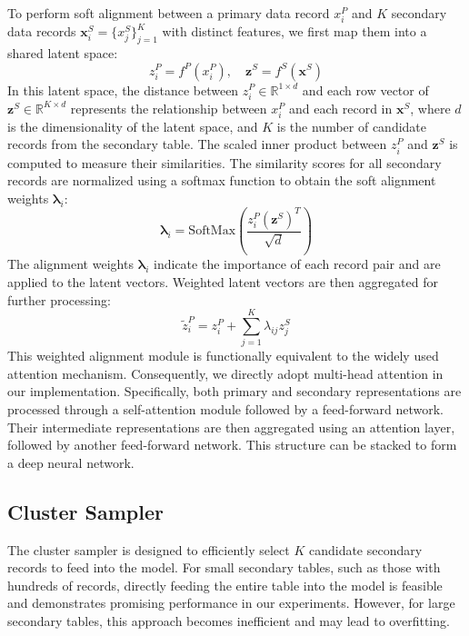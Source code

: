 To perform soft alignment between a primary data record \(x^P_i\) and \(K\) secondary data records \(\mathbf{x}^S_i = \{x^S_j\}_{j=1}^K\) with distinct features, we first map them into a shared latent space:
\begin{equation}
z^P_i = f^P(x^P_i), \quad \mathbf{z}^S = f^S(\mathbf{x}^S)
\end{equation}
In this latent space, the distance between \(z^P_i \in \mathbb{R}^{1 \times d}\) and each row vector of \(\mathbf{z}^S \in \mathbb{R}^{K \times d}\) represents the relationship between \(x^P_i\) and each record in \(\mathbf{x}^S\), where \(d\) is the dimensionality of the latent space, and \(K\) is the number of candidate records from the secondary table. The scaled inner product between \(z^P_i\) and \(\mathbf{z}^S\) is computed to measure their similarities. The similarity scores for all secondary records are normalized using a softmax function to obtain the soft alignment weights \(\boldsymbol{\lambda}_i\):
\begin{equation}
\boldsymbol{\lambda}_i = \text{SoftMax}\left(\frac{z^P_i (\mathbf{z}^S)^T}{\sqrt{d}}\right)
\end{equation}
The alignment weights \(\boldsymbol{\lambda}_i\) indicate the importance of each record pair and are applied to the latent vectors. Weighted latent vectors are then aggregated for further processing:
\begin{equation}
\tilde{z}^P_i = z^P_i + \sum_{j=1}^K \lambda_{ij} z^S_j
\end{equation}
This weighted alignment module is functionally equivalent to the widely used attention mechanism. Consequently, we directly adopt multi-head attention \cite{vaswani2017attention} in our implementation. Specifically, both primary and secondary representations are processed through a self-attention module followed by a feed-forward network. Their intermediate representations are then aggregated using an attention layer, followed by another feed-forward network. This structure can be stacked to form a deep neural network.


\subsection{Cluster Sampler}\label{subsec:cluster-sampler}

The cluster sampler is designed to efficiently select \(K\) candidate secondary records to feed into the model. For small secondary tables, such as those with hundreds of records, directly feeding the entire table into the model is feasible and demonstrates promising performance in our experiments. However, for large secondary tables, this approach becomes inefficient and may lead to overfitting.

